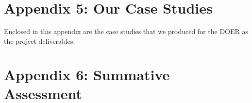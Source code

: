 \newpage
\addtocounter{page}{13}
\section*{Appendix 5: Our Case Studies}
\par Enclosed in this appendix are the case studies that we produced for the DOER as the project deliverables.


\newpage
\addtocounter{page}{6}
\section*{Appendix 6: Summative Assessment}


